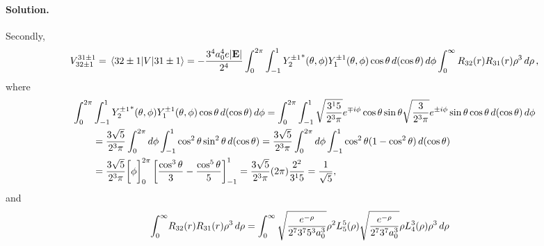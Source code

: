 \documentclass[11pt]{article}
\newcommand{\beqn}{\begin{equation}}
\newcommand{\eeqn}{\end{equation}}
\newenvironment{solution}
{
    \paragraph{Solution.}
    \ignorespaces
}
{
}
\begin{document}
\begin{solution}
	Secondly,
	\beqn \label{v2}
		V_{3 2 \pm1}^{3 1 \pm 1} = \mel{3 2 \pm1}{V}{3 1 \pm1}
		= -\frac{3^4 \ao^4 e |\vE|}{2^4} \int_0^{2\pi} \int_{-1}^1 {Y_2^{\pm1}}^*(\tht, \phi) Y_1^{\pm1}(\tht, \phi) \cos\tht \dcost \dphi \int_0^\infty R_{3 2}(r) R_{3 1}(r) \rho^3 \drho,
	\eeqn
	where
	\begin{align*}
		\int_0^{2\pi} &\int_{-1}^1 {Y_2^{\pm1}}^*(\theta, \phi) Y_1^{\pm1}(\theta, \phi) \cos\theta \dd{(\cos\theta)} \dd{\phi}
		= \int_0^{2\pi} \int_{-1}^1 \sqrt{\frac{3^1 5}{2^3 \pi}} e^{\mp i \phi} \cos\theta \sin\theta \sqrt{\frac{3}{2^3 \pi}} e^{\pm i \phi} \sin\theta \cos\theta \dd{(\cos\theta)} \dd{\phi} \\
		&= \frac{3 \sqrt{5}}{2^3 \pi} \int_0^{2\pi} \dd{\phi} \int_{-1}^1 \cos^2\theta \sin^2\theta \dd{(\cos\theta)}
		= \frac{3 \sqrt{5}}{2^3 \pi} \int_0^{2\pi} \dd{\phi} \int_{-1}^1 \cos^2\theta (1 - \cos^2\theta) \dd{(\cos\theta)} \\
		&= \frac{3 \sqrt{5}}{2^3 \pi} \bigg[ \phi \bigg]_0^{2\pi} \left[ \frac{\cos^3\theta}{3} - \frac{\cos^5\theta}{5} \right]_{-1}^1
		= \frac{3 \sqrt{5}}{2^3 \pi} (2\pi) \frac{2^2}{3^1 5}
		= \frac{1}{\sqrt{5}},
	\end{align*}
	and
	\begin{align*}
		\int_0^\infty &R_{3 2}(r) R_{3 1}(r) \rho^3 \dd{\rho}
		= \int_0^\infty \sqrt{\frac{e^{-\rho}}{2^7 3^7 5^3 a_0^3}} \rho^2 L_5^5(\rho) \sqrt{\frac{e^{-\rho}}{2^7 3^7 a_0^3}} \rho L_4^3(\rho) \rho^3 \dd{\rho}
	\end{align*}
	
	
\end{solution}
\end{document}
